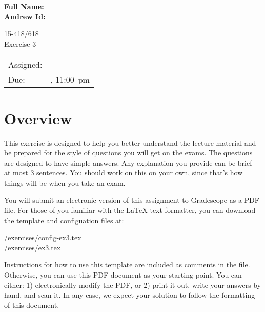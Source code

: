 \documentclass[11pt]{article}
\newcommand{\cref}[2]{\href{#1}{\color{blue}#2}}
\begin{document}
\begin{flushright}                         
{\large\bf Full Name: \makebox[2in][l]{    
                                           
                                           
}} \\[1ex]                                 
                                           
{\large\bf Andrew Id: \makebox[2in][l]{\tt 
                                           
}} \\[1ex]                                 
\end{flushright}                           
\vspace*{0.3in}                            
\begin{center}
\LARGE
15-418/618 \thisterm{} \\
Exercise 3
\end{center}

\begin{center}
\Large        
\begin{tabular}{ll}
\hline             
Assigned: & \dateassigned{}  \\
Due: &  \datedue{}, 11:00~pm  \\
\hline       
\end{tabular}
\end{center} 

\section*{Overview}

This exercise is designed to help you better understand the lecture
material and be prepared for the style of questions you will get on
the exams.  The questions are designed to have simple answers.  Any
explanation you provide can be brief---at most 3 sentences.  You
should work on this on your own, since that's how things will be when
you take an exam.

You will submit an electronic version of this assignment to Gradescope 
as a PDF file.  For those of you familiar with the \LaTeX{} text 
formatter, you can download the template and configuation files at: 
\begin{center} 
  \cref{\actualcoursehome/exercises/config-ex3.tex}{\visiblecoursehome/exercises/config-ex3.tex}\\ 
  \cref{\actualcoursehome/exercises/ex3.tex}{\visiblecoursehome/exercises/ex3.tex} 
\end{center} 
Instructions for how to use this template are included as comments in 
the file.  Otherwise, you can use this PDF document as your starting 
point.  You can either: 1) electronically modify the PDF, or 2) print 
it out, write your answers by hand, and scan it.  In any case, we 
expect your solution to follow the formatting of this document. 
\end{document}
